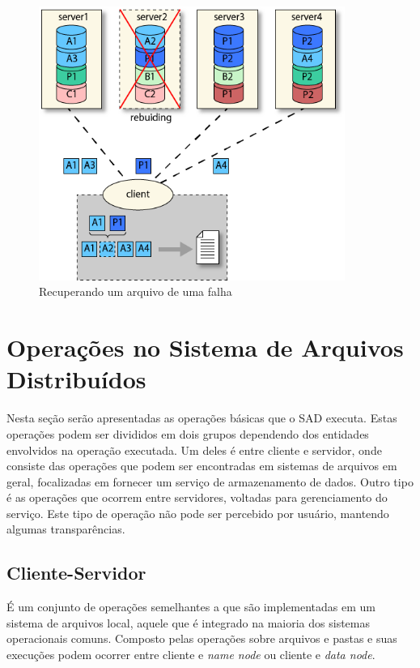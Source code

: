 	\begin{figure}[htb]
		\begin{center}
			
			\includegraphics[clip,width=10.0cm]{images/image2.png}
			\caption{Recuperando um arquivo de uma falha}
			\label{fig:img2}
		\end{center}
	\end{figure}
	
	\section{Operações no Sistema de Arquivos Distribuídos}
	
	Nesta seção serão apresentadas as operações básicas que o SAD executa. Estas operações podem ser divididos em dois grupos dependendo dos entidades envolvidos na operação executada. Um deles é entre cliente e servidor, onde consiste das operações que podem ser encontradas em sistemas de arquivos em geral, focalizadas em fornecer um serviço de armazenamento de dados. Outro tipo é as operações que ocorrem entre servidores, voltadas para gerenciamento do serviço. Este tipo de operação não pode ser percebido por usuário, mantendo algumas transparências.
	
	
	
	\subsection{Cliente-Servidor}
	
	É um conjunto de operações semelhantes a que são implementadas em um sistema de arquivos local, aquele que é integrado na maioria dos sistemas operacionais comuns. Composto pelas operações sobre arquivos e pastas e suas execuções podem ocorrer entre cliente e \textit{name node} ou cliente e \textit{data node}.
	
